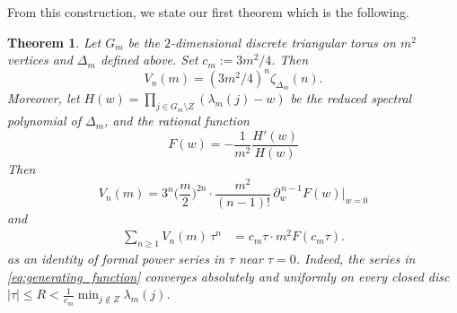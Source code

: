 \documentclass[11pt,reqno]{amsart}
\newtheorem{theorem}{Theorem}[section]
\theoremstyle{remark}
\begin{document}

From this construction, we state our first theorem which is the following.

\begin{theorem}
\label{thm:maina}
Let $G_{m}$ be the $2$-dimensional discrete triangular torus on $m^2$ vertices and $\Delta_m$ defined above. Set $c_m:=3m^2/4$. Then
$$
V_n(m)=( 3m^2/4)^n \zeta_{\Delta_m}(n).
$$
Moreover, let $H(w)=\prod_{j\in G_m \setminus Z}(\lambda_m(j)-w)$ be the reduced spectral polynomial of $\Delta_m$, and the rational function
$$
F(w)=-\frac{1}{m^2}\frac{H'(w)}{H(w)}
$$
Then
$$
V_n(m) = 3^n\Big(\frac m2\Big)^{2n}\cdot\frac{m^2}{(n-1)!}\,\partial_w^{\,n-1}F(w)\Big|_{w=0}
$$
and
\begin{align}\label{eq:generating_function}%
\sum_{n\ge1} V_n(m)\,\tau^n &= c_m\tau\cdot m^2F(c_m\tau).
\end{align}
as an identity of formal power series in $\tau$ near $\tau=0$. Indeed, the series in
\eqref{eq:generating_function} converges absolutely and uniformly on every closed disc
$\vert \tau \vert\leq R< \frac{1}{c_m}\min_{j\notin Z}\lambda_m(j) $.


\end{theorem}
\end{document}
